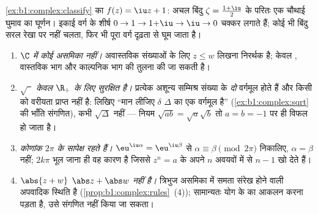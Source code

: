 \begin{omfigure}

{\small \cref{ex:b1:complex:classify} का  $f(z) = \iu z + 1$: अचल
बिंदु $\zeta = \frac{1+\iu}2$ के परितः एक चौथाई घुमाव का घूर्णन। इकाई वर्ग
के शीर्ष $0 \to 1 \to 1{+}\iu \to \iu \to 0$ चक्कर लगाते हैं; कोई भी बिंदु
सरल रेखा पर नहीं चलता, फिर भी पूरा वर्ग दृढ़ता से घूम जाता है।}
\end{omfigure}

\begin{remark}[मापांक और कोणांक की सामान्य भूलें]\label{rem:b1:complex:pitfalls}
\begin{enumerate}
  \item \emph{$\C$ में कोई असमिका नहीं।} अवास्तविक संख्याओं के लिए $z \leq
  w$ लिखना निरर्थक है; केवल , वास्तविक भाग और काल्पनिक भाग की तुलना की
  जा सकती है।
  \item \emph{$\sqrt{\phantom z}$ केवल $\R_+$ के लिए सुरक्षित है।} प्रत्येक
  अशून्य सम्मिश्र संख्या के \emph{दो} वर्गमूल होते हैं और किसी को वरीयता
  प्राप्त नहीं है: लिखिए ``मान लीजिए $\delta$ $\Delta$ का एक वर्गमूल है''
  (\cref{ex:b1:complex:sqrt} की भाँति संगणित), कभी $\sqrt\Delta$ नहीं ---
  नियम $\sqrt{ab} = \sqrt a\sqrt b$ तो $a = b = -1$ पर ही विफल हो जाता है।
  \item \emph{कोणांक $2\pi$ के सापेक्ष रहते हैं।} $\eu^{\iu\alpha} =
  \eu^{\iu\beta}$ से $\alpha \equiv \beta \pmod{2\pi}$ निकालिए, $\alpha =
  \beta$ नहीं; $2k\pi$ भूल जाना ही वह कारण है जिससे $z^n = a$ के 
  अपने $n$ अवयवों में से $n - 1$ खो देते हैं।
  \item \emph{$\abs{z + w}$ $\abs z + \abs w$ नहीं है।} त्रिभुज असमिका में
  समता संरेख होने वाली अपवादिक स्थिति है (\cref{prop:b1:complex:rules}~(4));
  सामान्यतः योग के  का आकलन करना पड़ता है, उसे संगणित नहीं किया जा
  सकता।
\end{enumerate}
\end{remark}

